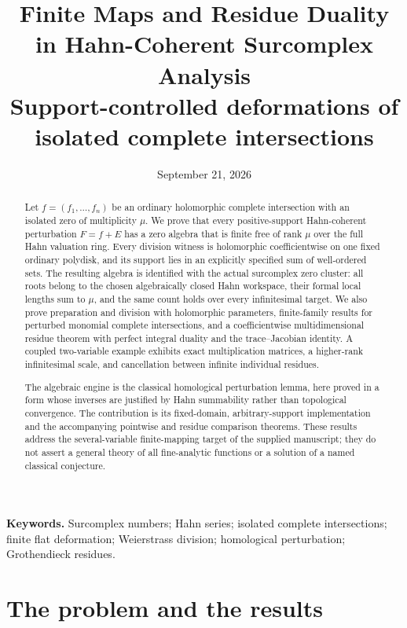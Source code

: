 \documentclass[11pt,letterpaper]{article}
\title{\bfseries Finite Maps and Residue Duality\\[0.3em]
\Large in Hahn-Coherent Surcomplex Analysis\\[0.5em]
\large Support-controlled deformations of isolated complete intersections}
\author{}
\date{September 21, 2026}
\theoremstyle{definition}
\theoremstyle{remark}
\begin{document}
\maketitle
\begin{abstract}
Let $f=(f_1,\ldots,f_n)$ be an ordinary holomorphic complete intersection with an isolated zero of multiplicity $\mu$. We prove that every positive-support Hahn-coherent perturbation $F=f+E$ has a zero algebra that is finite free of rank $\mu$ over the full Hahn valuation ring. Every division witness is holomorphic coefficientwise on one fixed ordinary polydisk, and its support lies in an explicitly specified sum of well-ordered sets. The resulting algebra is identified with the actual surcomplex zero cluster: all roots belong to the chosen algebraically closed Hahn workspace, their formal local lengths sum to $\mu$, and the same count holds over every infinitesimal target. We also prove preparation and division with holomorphic parameters, finite-family results for perturbed monomial complete intersections, and a coefficientwise multidimensional residue theorem with perfect integral duality and the trace--Jacobian identity. A coupled two-variable example exhibits exact multiplication matrices, a higher-rank infinitesimal scale, and cancellation between infinite individual residues.

The algebraic engine is the classical homological perturbation lemma, here proved in a form whose inverses are justified by Hahn summability rather than topological convergence. The contribution is its fixed-domain, arbitrary-support implementation and the accompanying pointwise and residue comparison theorems. These results address the several-variable finite-mapping target of the supplied manuscript; they do not assert a general theory of all fine-analytic functions or a solution of a named classical conjecture.
\end{abstract}
\vspace{0.3em}
\noindent\textbf{Keywords.} Surcomplex numbers; Hahn series; isolated complete intersections; finite flat deformation; Weierstrass division; homological perturbation; Grothendieck residues.
\clearpage
{\small\setlength{\parskip}{0pt}\tableofcontents}
\clearpage

\section{The problem and the results}
\label{sec:introduction}
\end{document}
